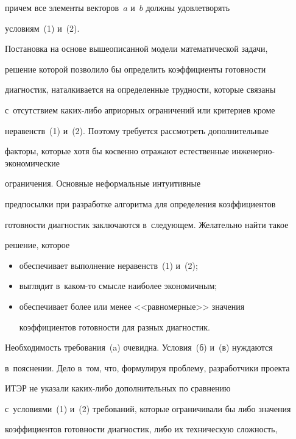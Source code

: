 причем все элементы векторов~$a$ и~$b$ долж\-ны удовле\-тво\-рять 


условиям~(1) и~(2).





Постановка на основе вышеописанной модели математической задачи, 


решение которой позволило бы определить коэффициенты го\-тов\-ности 


диагностик, наталкивается на определенные трудности, которые связаны 


с~отсутствием ка\-ких-ли\-бо априорных ограничений или критериев кроме 


неравенств~(1) и~(2). Поэтому требуется рас\-смот\-реть дополнительные 


факторы, которые хотя бы косвенно отражают естественные ин\-же\-нер\-но-эко\-но\-ми\-че\-ские 


ограничения. Основные неформальные интуитивные 


предпосылки при разработке алгоритма для определения коэффициентов 


го\-тов\-ности диагностик заключаются в~следующем. Желательно найти такое 


решение, которое


\begin{itemize}


\item[(а)] обеспечивает выполнение неравенств~(1) и~(2);


\item[(б)] выглядит в~каком-то смысле наиболее экономичным;


\item[(в)] обеспечивает более или менее <<равномерные>> значения 


коэффициентов готовности для разных диагностик.


\end{itemize}





Необходимость требования~(a) очевидна. Условия~(б) и~(в) нуждаются 


в~пояснении. Дело в~том, что, формулируя проб\-ле\-му, разработчики проекта 


ИТЭР не указали ка\-ких-ли\-бо дополнительных по сравнению 


с~условиями~(1) и~(2) требований, которые ограничивали бы либо значения 


коэффициентов готовности диагностик, либо их техническую сложность, 


